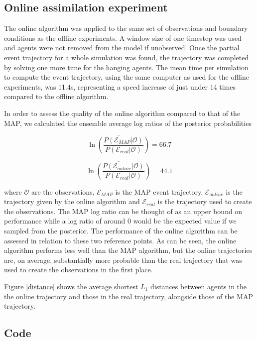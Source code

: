 \documentclass[sigconf]{aamas}
\begin{document}
\subsection{Online assimilation experiment}

The online algorithm was applied to the same set of observations and boundary conditions as the offline experiments. A window size of one timestep was used and agents were not removed from the model if unobserved. Once the partial event trajectory for a whole simulation was found, the trajectory was completed by solving one more time for the hanging agents. The mean time per simulation to compute the event trajectory, using the same computer as used for the offline experiments, was 11.4s, representing a speed increase of just under 14 times compared to the offline algorithm.

In order to assess the quality of the online algorithm compared to that of the MAP, we calculated the ensemble average log ratios of the posterior probabilities

\[
\overline{\ln\left(\frac{P(\mathcal{E}_{MAP}|\mathcal{O})}{P(\mathcal{E}_{real}|\mathcal{O})}\right)} = 66.7
\]

\[
\overline{\ln\left(\frac{P(\mathcal{E}_{online}|\mathcal{O})}{P(\mathcal{E}_{real}|\mathcal{O})}\right)} = 44.1
\]

where $\mathcal{O}$ are the observations, $\mathcal{E}_{MAP}$ is the MAP event trajectory, $\mathcal{E}_{online}$ is the trajectory given by the online algorithm and $\mathcal{E}_{real}$ is the trajectory used to create the observations. The MAP log ratio can be thought of as an upper bound on performance while a log ratio of around 0 would be the expected value if we sampled from the posterior. The performance of the online algorithm can be assessed in relation to these two reference points. As can be seen, the online algorithm performs less well than the MAP algorithm, but the online trajectories are, on average, substantially more probable than the real trajectory that was used to create the observations in the first place. 

Figure \ref{distance} shows the average shortest $L_1$ distances between agents in the the online trajectory and those in the real trajectory, alongside those of the MAP trajectory.

\subsection{Code}
\end{document}
